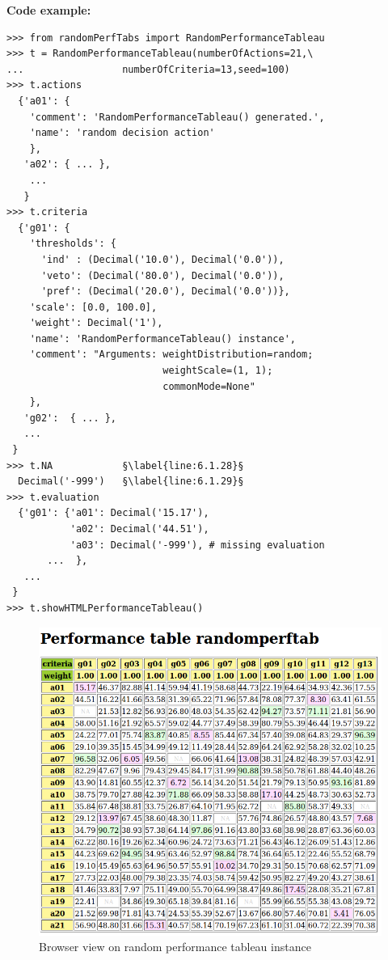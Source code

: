 \noindent \textbf{Code example:}
\begin{lstlisting}[caption={Generating a random performance tableau},label=list:6.1]
>>> from randomPerfTabs import RandomPerformanceTableau
>>> t = RandomPerformanceTableau(numberOfActions=21,\
...                 numberOfCriteria=13,seed=100)
>>> t.actions
  {'a01': {
    'comment': 'RandomPerformanceTableau() generated.',
    'name': 'random decision action'
    },
   'a02': { ... },
    ...
   }
>>> t.criteria
  {'g01': {
    'thresholds': {
      'ind' : (Decimal('10.0'), Decimal('0.0')),
      'veto': (Decimal('80.0'), Decimal('0.0')),
      'pref': (Decimal('20.0'), Decimal('0.0'))},
    'scale': [0.0, 100.0],
    'weight': Decimal('1'),
    'name': 'RandomPerformanceTableau() instance',
    'comment': "Arguments: weightDistribution=random;
                           weightScale=(1, 1);
                           commonMode=None"
    },
   'g02':  { ... },
   ...
 }
>>> t.NA            §\label{line:6.1.28}§
  Decimal('-999')   §\label{line:6.1.29}§
>>> t.evaluation
  {'g01': {'a01': Decimal('15.17'),
           'a02': Decimal('44.51'),
           'a03': Decimal('-999'), # missing evaluation
       ...  },
   ...
 }
>>> t.showHTMLPerformanceTableau()
\end{lstlisting}
\begin{figure}[ht]
\includegraphics[width=0.9\hsize]{Figures/6-1-randomPerfTab1.png}
\caption{Browser view on random performance tableau instance}
\label{fig:6.1}       %
\end{figure}

